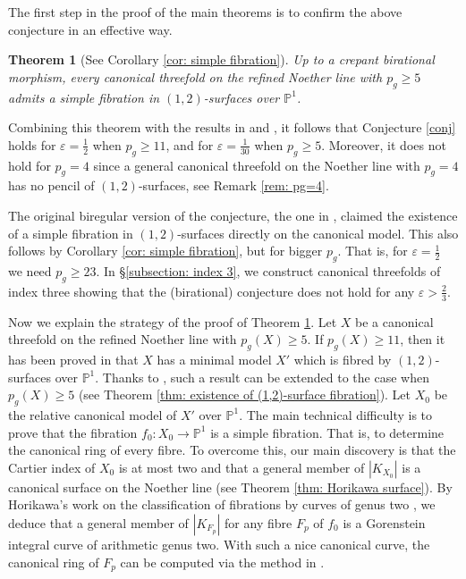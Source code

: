 \documentclass[a4paper,11pt]{amsart}
\newcommand{\PP}{\ensuremath{\mathbb{P}}}
\newtheorem{thm}{Theorem}[section]
\theoremstyle{definition}
\theoremstyle{remark}
\numberwithin{equation}{section}
\begin{document}
The first step in the proof of the main theorems is to confirm the above conjecture in an effective way.

\begin{thm} [See Corollary \ref{cor: simple fibration}] \label{thm: main3}
    Up to a crepant birational morphism, every canonical threefold on the refined Noether line with $p_g \ge 5$ admits a simple fibration in $(1, 2)$-surfaces over $\PP^1$.
\end{thm}

Combining this theorem with the results in \cite{HZ} and \cite{CHJ}, it follows that Conjecture \ref{conj} holds for $\varepsilon = \frac{1}{2}$ when $p_g \ge 11$, and for $\varepsilon = \frac{1}{30}$ when $p_g \ge 5$. Moreover, it does not hold for $p_g = 4$ since a general canonical threefold on the Noether line with $p_g = 4$ has no pencil of $(1, 2)$-surfaces, see Remark \ref{rem: pg=4}.

The original biregular version of the conjecture, the one in \cite[Introduction]{CP}, claimed the existence of a simple fibration in $(1,2)$-surfaces directly on the canonical model. This also follows by Corollary \ref{cor: simple fibration}, but for bigger $p_g$. That is, for $\varepsilon = \frac{1}{2}$ we need $p_g\ge 23$. In \S \ref{subsection: index 3}, we construct canonical threefolds of index three showing that the (birational) conjecture does not hold for any $\varepsilon > \frac23$. 

Now we explain the strategy of the proof of Theorem \ref{thm: main3}. Let $X$ be a canonical threefold on the refined Noether line with $p_g(X) \ge 5$. If $p_g(X) \ge 11$, then it has been proved in \cite{HZ} that $X$ has a minimal model $X'$ which is fibred by $(1, 2)$-surfaces over $\PP^1$. Thanks to \cite{CHJ}, such a result can be extended to the case when $p_g(X) \ge 5$ (see Theorem \ref{thm: existence of (1,2)-surface fibration}). Let $X_0$ be the relative canonical model of $X'$ over $\PP^1$. The main technical difficulty is to prove that the fibration $f_0\colon X_0 \to \PP^1$ is a simple fibration. That is, to determine the canonical ring of every fibre. To overcome this, our main discovery is that the Cartier index of $X_0$ is at most two and that a general member of $|K_{X_0}|$ is a canonical surface on the Noether line (see Theorem \ref{thm: Horikawa surface}). By Horikawa's work on the classification of fibrations by curves of genus two \cite{Horikawagenus2}, we deduce that a general member of $|K_{F_p}|$ for any fibre $F_p$ of $f_0$ is a Gorenstein integral curve of arithmetic genus two. With such a nice canonical curve, the canonical ring of $F_p$ can be computed via the method in \cite{CFPR,FPRb}.
\end{document}
